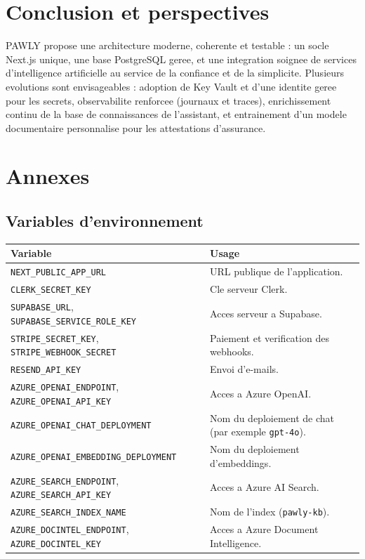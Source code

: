 \documentclass[11pt,a4paper]{article}
\begin{document}
\section{Conclusion et perspectives}
PAWLY propose une architecture moderne, coherente et testable : un socle Next.js
unique, une base PostgreSQL geree, et une integration soignee de services
d'intelligence artificielle au service de la confiance et de la simplicite.
Plusieurs evolutions sont envisageables : adoption de Key Vault et d'une identite
geree pour les secrets, observabilite renforcee (journaux et traces),
enrichissement continu de la base de connaissances de l'assistant, et
entrainement d'un modele documentaire personnalise pour les attestations
d'assurance.

\appendix
\section{Annexes}

\subsection{Variables d'environnement}
\begin{tabularx}{\linewidth}{@{}lX@{}}
\toprule
\textbf{Variable} & \textbf{Usage} \\
\midrule
\texttt{NEXT\_PUBLIC\_APP\_URL} & URL publique de l'application. \\
\texttt{CLERK\_SECRET\_KEY} & Cle serveur Clerk. \\
\texttt{SUPABASE\_URL}, \texttt{SUPABASE\_SERVICE\_ROLE\_KEY} & Acces serveur a Supabase. \\
\texttt{STRIPE\_SECRET\_KEY}, \texttt{STRIPE\_WEBHOOK\_SECRET} & Paiement et verification des webhooks. \\
\texttt{RESEND\_API\_KEY} & Envoi d'e-mails. \\
\texttt{AZURE\_OPENAI\_ENDPOINT}, \texttt{AZURE\_OPENAI\_API\_KEY} & Acces a Azure OpenAI. \\
\texttt{AZURE\_OPENAI\_CHAT\_DEPLOYMENT} & Nom du deploiement de chat (par exemple \texttt{gpt-4o}). \\
\texttt{AZURE\_OPENAI\_EMBEDDING\_DEPLOYMENT} & Nom du deploiement d'embeddings. \\
\texttt{AZURE\_SEARCH\_ENDPOINT}, \texttt{AZURE\_SEARCH\_API\_KEY} & Acces a Azure AI Search. \\
\texttt{AZURE\_SEARCH\_INDEX\_NAME} & Nom de l'index (\texttt{pawly-kb}). \\
\texttt{AZURE\_DOCINTEL\_ENDPOINT}, \texttt{AZURE\_DOCINTEL\_KEY} & Acces a Azure Document Intelligence. \\
\bottomrule
\end{tabularx}
\end{document}
